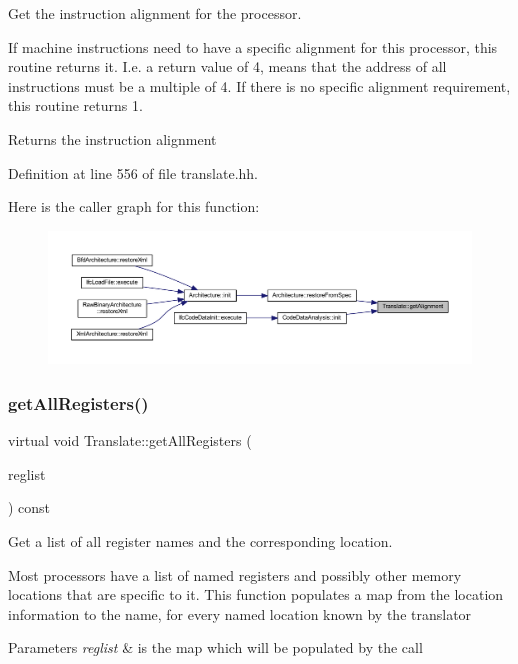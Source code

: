 Get the instruction alignment for the processor. 

If machine instructions need to have a specific alignment for this processor, this routine returns it. I.\+e. a return value of 4, means that the address of all instructions must be a multiple of 4. If there is no specific alignment requirement, this routine returns 1. \begin{DoxyReturn}{Returns}
the instruction alignment 
\end{DoxyReturn}


Definition at line 556 of file translate.\+hh.

Here is the caller graph for this function\+:
\nopagebreak
\begin{figure}[H]
\begin{center}
\leavevmode
\includegraphics[width=350pt]{class_translate_aeb013fbe5257988ffea2f8147b96620a_icgraph}
\end{center}
\end{figure}
\mbox{\label{class_translate_a4de12a5d1ad5f080604451e2ed3c163e}} 
\subsubsection{\texorpdfstring{getAllRegisters()}{getAllRegisters()}}
{\footnotesize\ttfamily virtual void Translate\+::get\+All\+Registers (\begin{DoxyParamCaption}\item[{map$<$ \mbox{\hyperlink{struct_varnode_data}{Varnode\+Data}}, string $>$ \&}]{reglist }\end{DoxyParamCaption}) const\hspace{0.3cm}{\ttfamily [pure virtual]}}



Get a list of all register names and the corresponding location. 

Most processors have a list of named registers and possibly other memory locations that are specific to it. This function populates a map from the location information to the name, for every named location known by the translator 
\begin{DoxyParams}{Parameters}
{\em reglist} & is the map which will be populated by the call \\
\hline
\end{DoxyParams}


